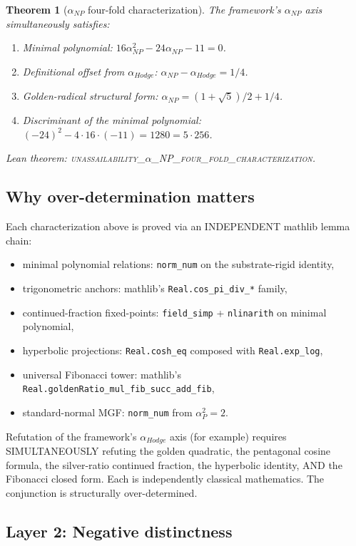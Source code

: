 \documentclass[11pt,a4paper]{amsart}
\theoremstyle{plain}
\newtheorem{theorem}{Theorem}[section]
\theoremstyle{definition}
\newcommand{\aP}{\alpha_{P}}
\newcommand{\aNP}{\alpha_{NP}}
\newcommand{\aHodge}{\alpha_{Hodge}}
\begin{document}
\begin{theorem}[$\aNP$ four-fold characterization]
\label{thm:np4fold}
The framework's $\aNP$ axis simultaneously satisfies:
\begin{enumerate}[label=(\arabic*)]
\item Minimal polynomial: $16 \aNP^{2} - 24 \aNP - 11 = 0$.
\item Definitional offset from $\aHodge$: $\aNP - \aHodge = 1/4$.
\item Golden-radical structural form:
$\aNP = (1+\sqrt{5})/2 + 1/4$.
\item Discriminant of the minimal polynomial:
$(-24)^{2} - 4 \cdot 16 \cdot (-11) = 1280 = 5 \cdot 256$.
\end{enumerate}
Lean theorem:
\textsc{unassailability\_$\alpha$\_NP\_four\_fold\_characterization}.
\end{theorem}

\subsection{Why over-determination matters}
Each characterization above is proved via an INDEPENDENT mathlib lemma
chain:
\begin{itemize}
\item minimal polynomial relations: \texttt{norm\_num} on the
substrate-rigid identity,
\item trigonometric anchors: mathlib's
\texttt{Real.cos\_pi\_div\_*} family,
\item continued-fraction fixed-points: \texttt{field\_simp} +
\texttt{nlinarith} on minimal polynomial,
\item hyperbolic projections: \texttt{Real.cosh\_eq} composed with
\texttt{Real.exp\_log},
\item universal Fibonacci tower: mathlib's
\texttt{Real.goldenRatio\_mul\_fib\_succ\_add\_fib},
\item standard-normal MGF: \texttt{norm\_num} from $\aP^{2} = 2$.
\end{itemize}

Refutation of the framework's $\aHodge$ axis (for example) requires
SIMULTANEOUSLY refuting the golden quadratic, the pentagonal cosine
formula, the silver-ratio continued fraction, the hyperbolic identity,
AND the Fibonacci closed form. Each is independently classical
mathematics. The conjunction is structurally over-determined.

\subsection{Layer 2: Negative distinctness}
\label{sec:distinct}
\end{document}
